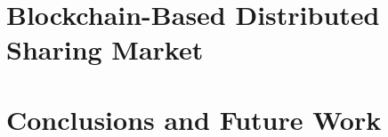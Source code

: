 \documentclass[11pt,a4paper,twoside,openright]{report}
\begin{document}
\chapter{Blockchain-Based Distributed Sharing Market}
\label{cpt:chapter_3}\acresetall%


\chapter{Conclusions and Future Work}
\label{cpt:conclusion}



{} \label{cpt:appendix}
\setcounter{section}{0}
\renewcommand*{\theHsection}{chY.\the\value{section}}
\renewcommand{\thesection}{\Alph{section}}
% 


 \label{cpt:acronyms}\acresetall


%
%

\begin{singlespacing}
    \cleardoublepage\pagestyle{bibmine}%
    
    
\end{singlespacing}


\cleardoublepage%
\pagestyle{mine}%

\begin{singlespacing}
\small
\printindex
\end{singlespacing}
\end{document}
